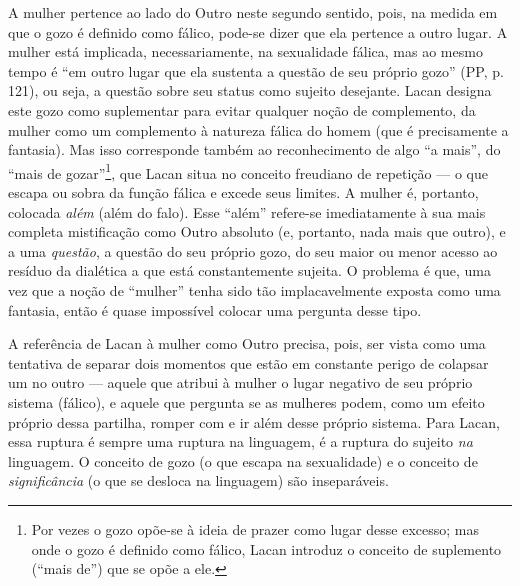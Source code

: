 A mulher pertence ao lado do Outro neste segundo sentido, pois, na
medida em que o gozo é definido como fálico, pode-se dizer que ela
pertence a outro lugar. A mulher está implicada, necessariamente, na
sexualidade fálica, mas ao mesmo tempo é ``em outro lugar que ela
sustenta a questão de seu próprio gozo'' (PP, p. 121), ou seja, a
questão sobre seu status como sujeito desejante. Lacan designa este gozo
como suplementar para evitar qualquer noção de complemento, da mulher
como um complemento à natureza fálica do homem (que é precisamente a
fantasia). Mas isso corresponde também ao reconhecimento de algo ``a
mais'', do ``mais de gozar''\footnote{Por vezes o gozo opõe-se à ideia
  de prazer como lugar desse excesso; mas onde o gozo é definido como
  fálico, Lacan introduz o conceito de suplemento (``mais de'') que se
  opõe a ele.}, que Lacan situa no conceito freudiano de repetição --- o
que escapa ou sobra da função fálica e excede seus limites. A mulher é,
portanto, colocada \emph{além} (além do falo). Esse ``além'' refere-se
imediatamente à sua mais completa mistificação como Outro absoluto (e,
portanto, nada mais que outro), e a uma \emph{questão}, a questão do seu
próprio gozo, do seu maior ou menor acesso ao resíduo da dialética a que
está constantemente sujeita. O problema é que, uma vez que a noção de
``mulher'' tenha sido tão implacavelmente exposta como uma fantasia,
então é quase impossível colocar uma pergunta desse tipo.

A referência de Lacan à mulher como Outro precisa, pois, ser vista como
uma tentativa de separar dois momentos que estão em constante perigo de
colapsar um no outro --- aquele que atribui à mulher o lugar negativo de
seu próprio sistema (fálico), e aquele que pergunta se as mulheres
podem, como um efeito próprio dessa partilha, romper com e ir além desse
próprio sistema. Para Lacan, essa ruptura é sempre uma ruptura na
linguagem, é a ruptura do sujeito \emph{na} linguagem. O conceito de
gozo (o que escapa na sexualidade) e o conceito de \emph{significância}
(o que se desloca na linguagem) são inseparáveis.

